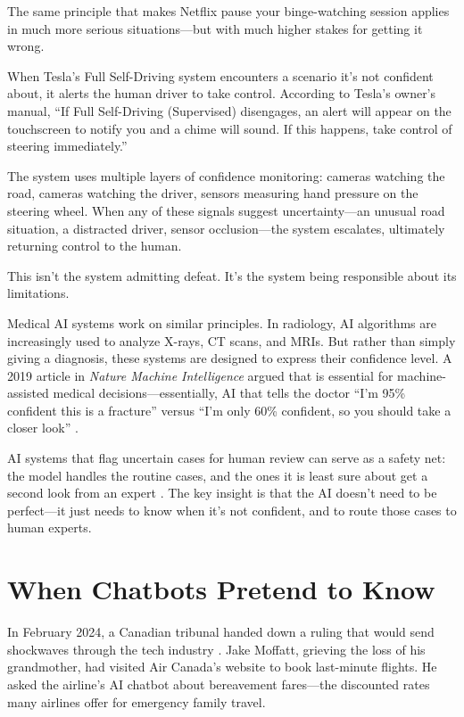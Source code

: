 The same principle that makes Netflix pause your binge-watching session applies in much more serious situations---but with much higher stakes for getting it wrong.

When Tesla's Full Self-Driving system encounters a scenario it's not confident about, it alerts the human driver to take control. According to Tesla's owner's manual, ``If Full Self-Driving (Supervised) disengages, an alert will appear on the touchscreen to notify you and a chime will sound. If this happens, take control of steering immediately.''

The system uses multiple layers of confidence monitoring: cameras watching the road, cameras watching the driver, sensors measuring hand pressure on the steering wheel. When any of these signals suggest uncertainty---an unusual road situation, a distracted driver, sensor occlusion---the system escalates, ultimately returning control to the human.

This isn't the system admitting defeat. It's the system being responsible about its limitations.

Medical AI systems work on similar principles. In radiology, AI algorithms are increasingly used to analyze X-rays, CT scans, and MRIs. But rather than simply giving a diagnosis, these systems are designed to express their confidence level. A 2019 article in \emph{Nature Machine Intelligence} argued that  is essential for machine-assisted medical decisions---essentially, AI that tells the doctor ``I'm 95\% confident this is a fracture'' versus ``I'm only 60\% confident, so you should take a closer look'' \autocite{begoli2019uncertainty}.

AI systems that flag uncertain cases for human review can serve as a safety net: the model handles the routine cases, and the ones it is least sure about get a second look from an expert \autocite{begoli2019uncertainty}. The key insight is that the AI doesn't need to be perfect---it just needs to know when it's not confident, and to route those cases to human experts.

\section{When Chatbots Pretend to Know}
\label{sec:air-canada}

In February 2024, a Canadian tribunal handed down a ruling that would send shockwaves through the tech industry \autocite{moffatt2024}. Jake Moffatt, grieving the loss of his grandmother, had visited Air Canada's website to book last-minute flights. He asked the airline's AI chatbot about bereavement fares---the discounted rates many airlines offer for emergency family travel.

